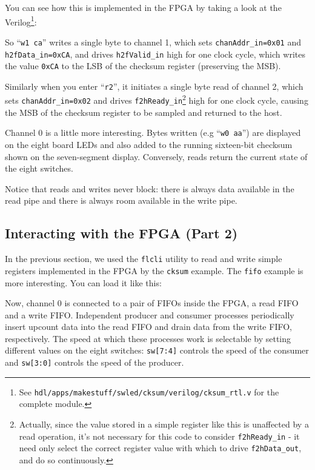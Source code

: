 You can see how this is implemented in the FPGA by taking a look at the Verilog\footnote{See \texttt{hdl/apps/makestuff/swled/cksum/verilog/cksum\_rtl.v} for the complete module.}:


So ``\texttt{w1 ca}'' writes a single byte to channel 1, which sets \texttt{chanAddr\_in=0x01} and \texttt{h2fData\_in=0xCA}, and drives \texttt{h2fValid\_in} high for one clock cycle, which writes the value \texttt{0xCA} to the LSB of the checksum register (preserving the MSB).

Similarly when you enter ``\texttt{r2}'', it initiates a single byte read of channel 2, which sets \texttt{chanAddr\_in=0x02} and drives \texttt{f2hReady\_in}\footnote{Actually, since the value stored in a simple register like this is unaffected by a read operation, it's not necessary for this code to consider \texttt{f2hReady\_in} - it need only select the correct register value with which to drive \texttt{f2hData\_out}, and do so continuously.} high for one clock cycle, causing the MSB of the checksum register to be sampled and returned to the host.

Channel 0 is a little more interesting. Bytes written (e.g ``\texttt{w0 aa}'') are displayed on the eight board LEDs and also added to the running sixteen-bit checksum shown on the seven-segment display. Conversely, reads return the current state of the eight switches.

Notice that reads and writes never block: there is always data available in the read pipe and there is always room available in the write pipe.

\subsection{Interacting with the FPGA (Part 2)}
In the previous section, we used the \texttt{flcli} utility to read and write simple registers implemented in the FPGA by the \texttt{cksum} example. The \texttt{fifo} example is more interesting. You can load it like this:


Now, channel 0 is connected to a pair of FIFOs inside the FPGA, a read FIFO and a write FIFO. Independent producer and consumer processes periodically insert upcount data into the read FIFO and drain data from the write FIFO, respectively. The speed at which these processes work is selectable by setting different values on the eight switches: \texttt{sw[7:4]} controls the speed of the consumer and \texttt{sw[3:0]} controls the speed of the producer.


